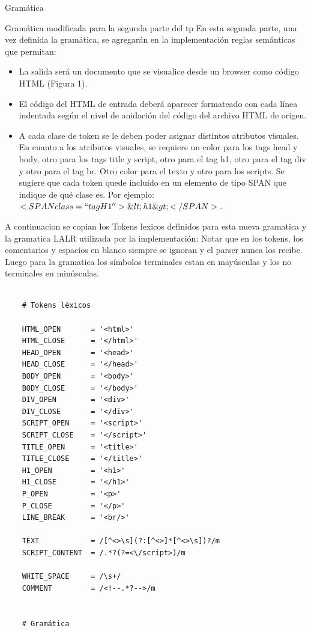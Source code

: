 \documentclass[a4paper,8pt]{article}
\begin{document}
\begin{section}{Gramática}
\begin{subsection}{Gramática modificada para la segunda parte del tp}
En esta segunda parte, una vez definida la gramática, se agregarán en la implementación reglas semánticas que permitan:\\
\begin{itemize}
 \item La salida será un documento que se visualice desde un browser como código HTML (Figura 1).
\item El código del HTML de entrada deberá aparecer formateado con cada línea indentada según el nivel de anidación del código del archivo HTML de origen. 
\item A cada clase de token se le deben poder asignar distintos atributos visuales. En cuanto a los atributos visuales, se requiere un color para los tags head y body, otro para los tags title y script, otro para el tag h1, otro para el tag div y otro para el tag br. Otro color para el texto y otro para los scripts.
Se sugiere que cada token quede incluido en un elemento de tipo SPAN que indique de qué clase es.
Por ejemplo:$<SPAN class=``tagH1''>\&lt;h1\&gt;</SPAN>.$

\end{itemize}

A continuacion se copian los Tokens lexicos definidos para esta nueva gramatica y la gramatica LALR utilizada por la implementación:
Notar que en los tokens, los comentarios y espacios en blanco siempre se ignoran y el parser nunca los recibe.
Luego para la gramatica los símbolos terminales estan en mayúsculas y los no terminales en minúsculas.

\begin{verbatim}
  
    # Tokens léxicos

    HTML_OPEN       = '<html>'
    HTML_CLOSE      = '</html>'
    HEAD_OPEN       = '<head>'
    HEAD_CLOSE      = '</head>'
    BODY_OPEN       = '<body>'
    BODY_CLOSE      = '</body>'
    DIV_OPEN        = '<div>'
    DIV_CLOSE       = '</div>'
    SCRIPT_OPEN     = '<script>'
    SCRIPT_CLOSE    = '</script>'
    TITLE_OPEN      = '<title>'
    TITLE_CLOSE     = '</title>'
    H1_OPEN         = '<h1>'
    H1_CLOSE        = '</h1>'
    P_OPEN          = '<p>'
    P_CLOSE         = '</p>'
    LINE_BREAK      = '<br/>'

    TEXT            = /[^<>\s](?:[^<>]*[^<>\s])?/m
    SCRIPT_CONTENT  = /.*?(?=<\/script>)/m

    WHITE_SPACE     = /\s+/
    COMMENT         = /<!--.*?-->/m


    # Gramática


\end{verbatim}
\end{subsection}
\end{section}
\end{document}
